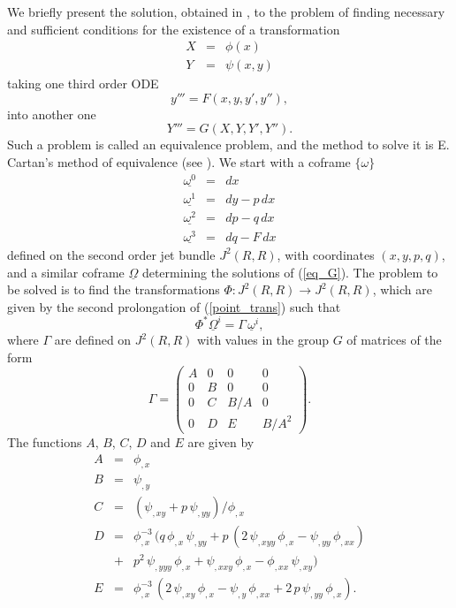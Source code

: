 We briefly present the solution, obtained in \cite{T_Grebot94}, to the problem 
of finding necessary and sufficient conditions for the existence of 
a transformation 
\begin{equation}
\label{point_trans}
\begin{array}{ccc}
X&=&\phi(x) \\
Y&=&\psi(x,y) 
\end{array} 
\end{equation}
taking one third order ODE 
\begin{equation}
\label{eq_F}
y'''=F(x,y,y',y''),
\end{equation}
into another one 
\begin{equation}
\label{eq_G}
Y'''=G(X,Y,Y',Y'').
\end{equation}
Such a problem is called an equivalence problem, and the method to solve it 
is E. Cartan's method of equivalence (see \cite{B_Gardn89}). 
We start with a coframe $\{ \omega \}$ 
\begin{eqnarray*}
\underline{\omega^{0}}&=& dx \\
\underline{\omega^{1}}&=& dy-p\,dx \\
\underline{\omega^{2}}&=& dp-q\,dx \\
\underline{\omega^{3}}&=& dq-F\,dx 
\end{eqnarray*}
defined on the second order jet bundle $J^{2}(R,R)$, with coordinates 
$(x,y,p,q)$, and a similar coframe $\underline{\Omega}$ determining the 
solutions of (\ref{eq_G}). 
The problem to be solved is to find the transformations 
$\Phi: J^{2}(R,R) \rightarrow J^{2}(R,R)$, which are given by the 
second prolongation of (\ref{point_trans}) such that 
\begin{equation}
\Phi^{\ast} \underline{\Omega}^{i}=\Gamma\,\underline{\omega}^{i},
\end{equation}
where $\Gamma$ are defined on $J^{2}(R,R)$ with values in the group 
$G$ of matrices of the form 
\begin{equation}
\label{Gamma}
\Gamma=\left(
\begin{array}{cccc}
A & 0 & 0 & 0 \\
0 & B & 0 & 0 \\
0 & C & B/A & 0 \\
0 & D & E & B/A^{2} 
\end{array} \right).
\end{equation}
The functions $A$, $B$, $C$, $D$ and $E$ are given by 
\begin{eqnarray*} 
A&=&\phi_{,x} \\
B&=&\psi_{,y} \\
C&=&(\psi_{,xy}+p\,\psi_{,yy})/\phi_{,x} \\
D&=& \phi_{,x}^{-3}\,(q\,\phi_{,x}\,\psi_{,yy} 
+p\,(2\,\psi_{,xyy}\,\phi_{,x}-\psi_{,yy}\,\phi_{,xx}) \nonumber \\
& + & p^{2}\,\psi_{,yyy}\,\phi_{,x} 
+ \psi_{,xxy}\,\phi_{,x} - \phi_{,xx}\,\psi_{,xy}) \\
E&=& \phi_{,x}^{-3}\,(2\,\psi_{,xy}\,\phi_{,x}-\psi_{,y}\,\phi_{,xx}
+ 2\,p\,\psi_{,yy}\,\phi_{,x} ).
\end{eqnarray*}
